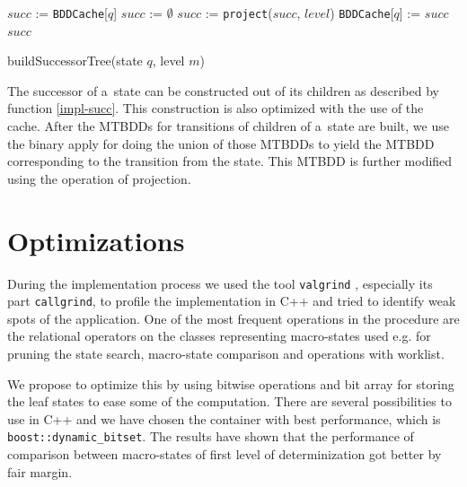 \begin{function}[h!]
		\BlankLine
		\nl $\mathit{succ}$ := \texttt{BDDCache}[$q$]\;
		\nl {}
		\nl $\mathit{succ}$ := $\emptyset$\;
		\nl{}
		\nl $\mathit{succ}$ := \texttt{project}($\mathit{succ}$,
		$\mathit{level}$)\; \nl \texttt{BDDCache}[$q$] := $\mathit{succ}$\;
		\nl \Return $\mathit{succ}$\;
		\caption{buildSuccessorTree(state $q$, level $m$)}\label{impl-succ}
	\end{function}
\newpage
 The successor of a~state can be constructed out of its children
 as described by function \ref{impl-succ}.
 This construction is also optimized with the use of the cache. After the MTBDDs
 for transitions of children of a~state are built, we use the binary apply for doing
 the union of those MTBDDs to yield the MTBDD corresponding to the transition
 from the state. This MTBDD is further modified using the operation of
 projection.
 
 \section{Optimizations}\label{optimizations}
 
 During the implementation process we used the tool \texttt{valgrind}
 \cite{valgrind}, especially its part \texttt{callgrind}, to profile the
 implementation in C++ and tried to identify weak spots of the application.
 One of the most frequent operations in the procedure are the relational
 operators on the classes representing macro-states used e.g. for pruning the
 state search, macro-state comparison and operations with worklist.
 
 We propose to optimize this by using bitwise operations and bit array for
 storing the leaf states to ease some of the computation. There are several
 possibilities to use in C++ \cite{bitwise} and we have chosen the container
 with best performance, which is \texttt{boost::dynamic\_bitset}. The results
 have shown that the performance of comparison between macro-states of first
 level of determinization got better by fair margin. 
 
